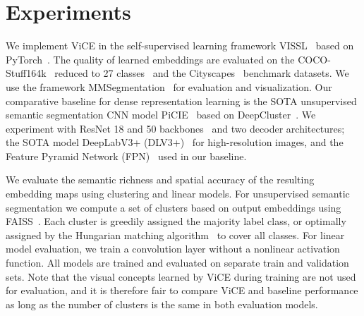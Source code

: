 \documentclass{bmvc2k}
\begin{document}
\section{Experiments}
\label{sec:experiments}

We implement ViCE in the self-supervised learning framework VISSL~\cite{goyal2021vissl} based on PyTorch~\cite{Paszke2019Pytorch}. The quality of learned embeddings are evaluated on the COCO-Stuff164k~\cite{Lin2014COCO, Caesar2018COCOStuffTA} reduced to 27 classes~\cite{Ji2019IIC} and the Cityscapes~\cite{Cordts2016Cityscapes} benchmark datasets. We use the framework MMSegmentation~\cite{mmseg2020} for evaluation and visualization. Our comparative baseline for dense representation learning is the SOTA unsupervised semantic segmentation CNN model PiCIE~\cite{Cho2021PiCIE} based on DeepCluster~\cite{Caron2018DeepCluster}. We experiment with ResNet 18 and 50 backbones~\cite{He2016ResNet50} and two decoder architectures; the SOTA model DeepLabV3+ (DLV3+)~\cite{Chen2018DeepLabV3Plus} for high-resolution images, and the Feature Pyramid Network (FPN)~\cite{Lin2017FPN} used in our baseline.

We evaluate the semantic richness and spatial accuracy of the resulting embedding maps using clustering and linear models. For unsupervised semantic segmentation we compute a set of  clusters based on output embeddings using FAISS~\cite{Johnson2019FAISS}. Each cluster is greedily assigned the majority label class, or optimally assigned by the Hungarian matching algorithm~\cite{Kuhn1955Hungarian} to cover all classes. For linear model evaluation, we train a  convolution layer without a nonlinear activation function. All models are trained and evaluated on separate train and validation sets. Note that the visual concepts learned by ViCE during training are not used for evaluation, and it is therefore fair to compare ViCE and baseline performance as long as the number of clusters is the same in both evaluation models. 
\end{document}
